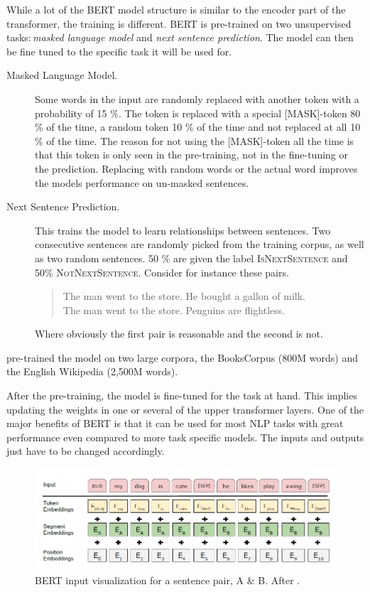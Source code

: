 While a lot of the BERT model structure is similar to the encoder part of the transformer, the training is different. BERT is pre-trained on two unsupervised tasks$\colon$\emph{masked language model} and \emph{next sentence prediction}. The model can then be fine tuned to the specific task it will be used for. 
\begin{description}
    \item[Masked Language Model.] Some words in the input are randomly replaced with another token with a probability of 15 \%. The token is replaced with a special \textsc{[MASK]}-token 80 \% of the time, a random token 10 \% of the time and not replaced at all 10 \% of the time. The reason for not using the \textsc{[MASK]}-token all the time is that this token is only seen in the pre-training, not in the fine-tuning or the prediction. Replacing with random words or the actual word improves the models performance on un-masked sentences. 
    \item[Next Sentence Prediction. ] This trains the model to learn relationships between sentences. Two consecutive sentences are randomly picked from the training corpus, as well as two random sentences. 50 \% are given the label \textsc{IsNextSentence} and 50\% \textsc{NotNextSentence}. Consider for instance these pairs. 
    \begin{quote}
        The man went to the store. 
        He bought a gallon of milk. \\
        The man went to the store.
        Penguins are flightless. 
    \end{quote}
    Where obviously the first pair is reasonable and the second is not.
\end{description}
\citeauthor{devlin2018bert} pre-trained the model on two large corpora, the BooksCorpus (800M words) and the English Wikipedia (2,500M words). 

After the pre-training, the model is fine-tuned for the task at hand. This implies updating the weights in one or several of the upper transformer layers. One of the major benefits of BERT is that it can be used for most NLP tasks with great performance even compared to more task specific models. The inputs and outputs just have to be changed accordingly. 

\begin{figure}[ht]
    \centering
    \includegraphics[width=\textwidth]{Figures/bert_inputrep.png}
    \caption{BERT input visualization for a sentence pair, A \& B. After \citet{devlin2018bert}.}
    \label{fig:berttokens}
\end{figure}


